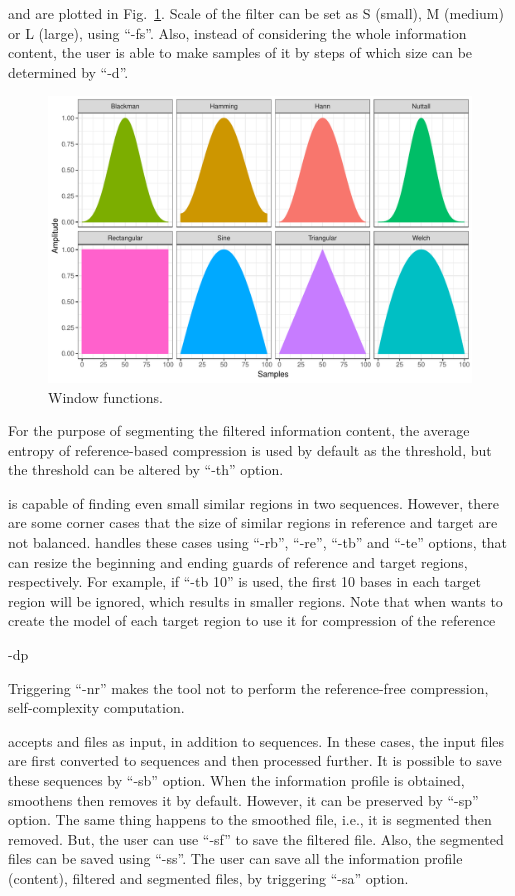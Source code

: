 and are plotted in Fig.~\ref{fig.filters}.
Scale of the filter can be set as S (small), M (medium) or L (large), using ``-fs''.
Also, instead of considering the whole information content, the user is able to make samples of it by steps of which size can be determined by ``-d''.
\begin{figure}[!h]
  \centering
  \includegraphics[width=\linewidth]{filters.pdf}
  \caption{Window functions.}
  \label{fig.filters}
\end{figure}

For the purpose of segmenting the filtered information content, the average entropy of reference-based compression is used by default as the threshold, but the threshold can be altered by ``-th'' option.

\smashpp is capable of finding even small similar regions in two sequences. However, there are some corner cases that the size of similar regions in reference and target are not balanced. \smashpp handles these cases using ``-rb'', ``-re'', ``-tb'' and ``-te'' options, that can resize the beginning and ending guards of reference and target regions, respectively.
For example, if ``-tb 10'' is used, the first 10 bases in each target region will be ignored, which results in smaller regions.
Note that when \smashpp wants to create the model of each target region to use it for compression of the reference

-dp

Triggering ``-nr'' makes the tool not to perform the reference-free compression, self-complexity computation.

\smashpp accepts \fasta and \fastq files as input, in addition to sequences. In these cases, the input files are first converted to sequences and then processed further. It is possible to save these sequences by ``-sb'' option.
When the information profile is obtained, \smashpp smoothens then removes it by default. However, it can be preserved by ``-sp'' option.
The same thing happens to the smoothed file, i.e., it is segmented then removed. But, the user can use ``-sf'' to save the filtered file. 
Also, the segmented files can be saved using ``-ss''. 
The user can save all the information profile (content), filtered and segmented files, by triggering ``-sa'' option.

